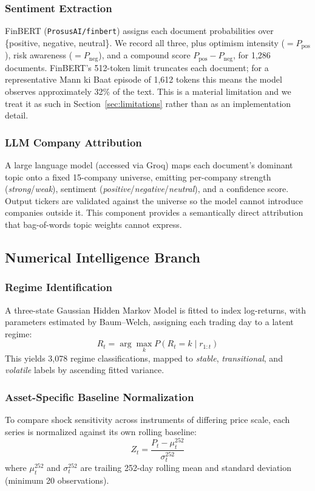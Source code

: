 \documentclass[11pt]{article}
\begin{document}
\subsubsection{Sentiment Extraction}
FinBERT (\texttt{ProsusAI/finbert}) assigns each document probabilities over \{positive, negative, neutral\}. We record all three, plus optimism intensity ($=P_{\text{pos}}$), risk awareness ($=P_{\text{neg}}$), and a compound score $P_{\text{pos}} - P_{\text{neg}}$, for 1{,}286 documents. FinBERT's 512-token limit truncates each document; for a representative Mann ki Baat episode of 1{,}612 tokens this means the model observes approximately 32\% of the text. This is a material limitation and we treat it as such in Section~\ref{sec:limitations} rather than as an implementation detail.

\subsubsection{LLM Company Attribution}
A large language model (accessed via Groq) maps each document's dominant topic onto a fixed 15-company universe, emitting per-company strength (\textit{strong}/\textit{weak}), sentiment (\textit{positive}/\textit{negative}/\textit{neutral}), and a confidence score. Output tickers are validated against the universe so the model cannot introduce companies outside it. This component provides a semantically direct attribution that bag-of-words topic weights cannot express.

\subsection{Numerical Intelligence Branch}

\subsubsection{Regime Identification}
A three-state Gaussian Hidden Markov Model is fitted to index log-returns, with parameters estimated by Baum--Welch, assigning each trading day to a latent regime:
\begin{equation}
R_t = \arg\max_k P(R_t = k \mid r_{1:t})
\label{eq:hmm_regime}
\end{equation}
This yields 3{,}078 regime classifications, mapped to \textit{stable}, \textit{transitional}, and \textit{volatile} labels by ascending fitted variance.

\subsubsection{Asset-Specific Baseline Normalization}
To compare shock sensitivity across instruments of differing price scale, each series is normalized against its own rolling baseline:
\begin{equation}
Z_t = \frac{P_t - \mu^{252}_t}{\sigma^{252}_t}
\label{eq:asbn}
\end{equation}
where $\mu^{252}_t$ and $\sigma^{252}_t$ are trailing 252-day rolling mean and standard deviation (minimum 20 observations).
\end{document}
